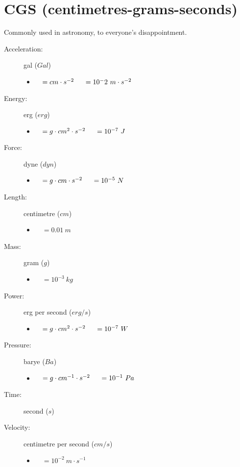 \documentclass[]{report}
\newcommand \tab[1][1cm]{\hspace*{#1}}
\newcommand{\items}{\item\ \ }
\begin{document}
\section{CGS (centimetres-grams-seconds)}

Commonly used in astronomy, to everyone's disappointment.
\begin{description}

\item[Acceleration:] gal ($Gal$)
\begin{itemize}
\items $=cm\cdot s^{-2} \tab[0.5cm]=10^-2\  m \cdot s^{-2}$
\end{itemize}

\item[Energy:] erg ($erg$)
\begin{itemize}
\items $=g\cdot cm^{2}\cdot s^{-2} \tab[0.5cm]=10^{-7}\ J$
\end{itemize}

\item[Force:] dyne ($dyn$)
\begin{itemize}
\items $=g\cdot cm \cdot s^{-2} \tab[0.5cm]=10^{-5}\ N$
\end{itemize}

\item[Length:] centimetre ($cm$)
\begin{itemize}
\items $= 0.01\ m$
\end{itemize}				

\item[Mass:] gram ($g$)
\begin{itemize}
\items $=10^{-3}\  kg$
\end{itemize}

\item[Power:] erg per second ($erg/s$)
\begin{itemize}
\items $=g\cdot cm^{2}\cdot s^{-2} \tab[0.5cm]= 10^{-7}\ W$
\end{itemize}

\item[Pressure:] barye ($Ba$)
\begin{itemize}
\items $=g\cdot cm^{-1}\cdot s^{-2} \tab[0.5cm]= 10^{-1}\ Pa$
\end{itemize}
                
\item[Time:] second ($s$)

\item[Velocity:] centimetre per second ($cm/s$)
\begin{itemize}
\items $= 10^{-2}\ m\cdot s^{-1}$
\end{itemize}


\end{description}
\end{document}
